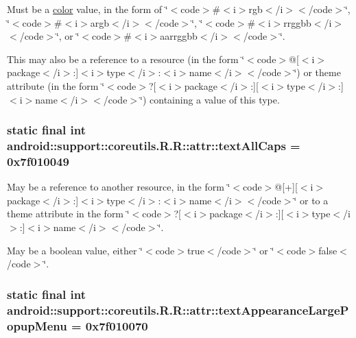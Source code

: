 Must be a \hyperlink{classandroid_1_1support_1_1coreutils_1_1_r_1_1color}{color} value, in the form of \char`\"{}$<$code$>$\#$<$i$>$rgb$<$/i$>$$<$/code$>$\char`\"{}, \char`\"{}$<$code$>$\#$<$i$>$argb$<$/i$>$$<$/code$>$\char`\"{}, \char`\"{}$<$code$>$\#$<$i$>$rrggbb$<$/i$>$$<$/code$>$\char`\"{}, or \char`\"{}$<$code$>$\#$<$i$>$aarrggbb$<$/i$>$$<$/code$>$\char`\"{}. 

This may also be a reference to a resource (in the form \char`\"{}$<$code$>$@\mbox{[}$<$i$>$package$<$/i$>$:\mbox{]}$<$i$>$type$<$/i$>$:$<$i$>$name$<$/i$>$$<$/code$>$\char`\"{}) or theme attribute (in the form \char`\"{}$<$code$>$?\mbox{[}$<$i$>$package$<$/i$>$:\mbox{]}\mbox{[}$<$i$>$type$<$/i$>$:\mbox{]}$<$i$>$name$<$/i$>$$<$/code$>$\char`\"{}) containing a value of this type. \hypertarget{classandroid_1_1support_1_1coreutils_1_1_r_1_1attr_b7b1c8a0c971e6901b2221500092f4fc}{
\subsubsection[{textAllCaps}]{\setlength{\rightskip}{0pt plus 5cm}static final int android::support::coreutils.R.R::attr::textAllCaps = 0x7f010049}}
\label{classandroid_1_1support_1_1coreutils_1_1_r_1_1attr_b7b1c8a0c971e6901b2221500092f4fc}


May be a reference to another resource, in the form \char`\"{}$<$code$>$@\mbox{[}+\mbox{]}\mbox{[}$<$i$>$package$<$/i$>$:\mbox{]}$<$i$>$type$<$/i$>$:$<$i$>$name$<$/i$>$$<$/code$>$\char`\"{} or to a theme attribute in the form \char`\"{}$<$code$>$?\mbox{[}$<$i$>$package$<$/i$>$:\mbox{]}\mbox{[}$<$i$>$type$<$/i$>$:\mbox{]}$<$i$>$name$<$/i$>$$<$/code$>$\char`\"{}. 

May be a boolean value, either \char`\"{}$<$code$>$true$<$/code$>$\char`\"{} or \char`\"{}$<$code$>$false$<$/code$>$\char`\"{}. \hypertarget{classandroid_1_1support_1_1coreutils_1_1_r_1_1attr_e0037c83ef07e0b93a2fadab5cb1f950}{
\subsubsection[{textAppearanceLargePopupMenu}]{\setlength{\rightskip}{0pt plus 5cm}static final int android::support::coreutils.R.R::attr::textAppearanceLargePopupMenu = 0x7f010070}}
\label{classandroid_1_1support_1_1coreutils_1_1_r_1_1attr_e0037c83ef07e0b93a2fadab5cb1f950}


